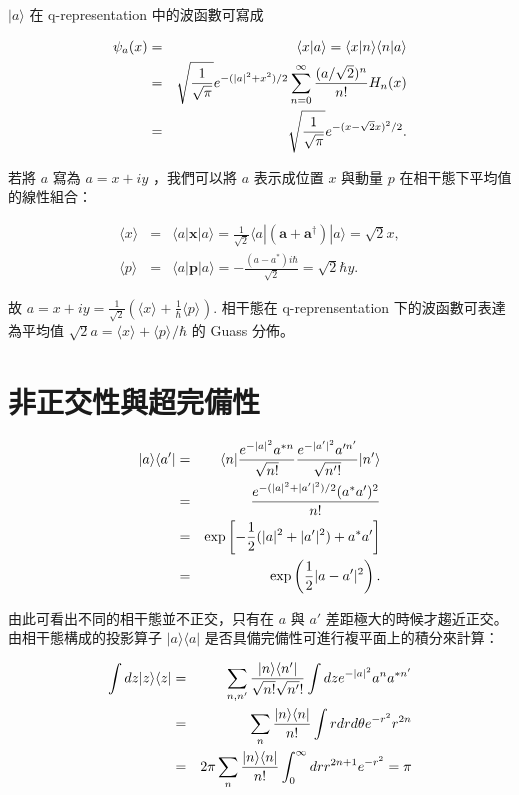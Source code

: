 \documentclass[pop,reprint]{revtex4-1}
\newcommand{\bra}[1]{\langle#1|}
\newcommand{\ket}[1]{|#1\rangle }
\newcommand{\braket}[2]{\langle#1|#2\rangle }
\newcommand{\expect}[2]{\langle #1\rangle_{#2}}
\begin{document}
$ \ket{a} $ 在 q-representation 中的波函數可寫成

\begin{eqnarray}
\notag\psi_a(x)&=&\braket{x}{a}=\braket{x}{n}\braket{n}{a}\\
\notag&=& \sqrt{\frac{1}{\sqrt{\pi}}}e^{-(|a|^2+x^2)/2}\sum_{n=0}^\infty\frac{(a/\sqrt{2})^n}{n!}H_n(x)\\
&=&\sqrt{\frac{1}{\sqrt{\pi}}}e^{-(x-\sqrt{2}x)^2/2}.
\end{eqnarray}

若將 $ a $ 寫為 $ a=x+iy $ ，我們可以將 $ a $ 表示成位置 $ x $ 與動量 $ p $ 在相干態下平均值的線性組合：

\begin{eqnarray}
\expect{x}{}&=&\bra{a}\bm{x}\ket{a}=\frac{1}{\sqrt{2}}\bra{a}(\bm{a}+\bm{a}^\dag)\ket{a}=\sqrt{2}x,\\
\expect{p}{}&=&\bra{a}\bm{p}\ket{a}=-\frac{(a-a^*)i\hbar}{\sqrt{2}}=\sqrt{2}\hbar y.
\end{eqnarray}

故 $ \displaystyle a=x+iy=\frac{1}{\sqrt{2}}\left(\expect{x}{}+\frac{1}{\hbar}\expect{p}{}\right) $. 相干態在 q-reprensentation 下的波函數可表達為平均值 $ \sqrt{2}a=\expect{x}{}+\expect{p}{}/\hbar $ 的 Guass 分佈。

\section{非正交性與超完備性}

\begin{eqnarray}
\notag\ket{a}\bra{a'}&=&\bra{n}\frac{e^{-|a|^2}a^{*n}}{\sqrt{n!}}\frac{e^{-|a'|^2}a'^{n'}}{\sqrt{n'!}}\ket{n'}\\
\notag&=&\frac{e^{-(|a|^2+|a'|^2)/2}(a^*a')^2}{n!}\\
\notag&=&\exp\left[-\frac{1}{2}(|a|^2+|a'|^2)+a^*a'\right]\\
&=&\exp\left(\frac{1}{2}|a-a'|^2\right).
\end{eqnarray}

由此可看出不同的相干態並不正交，只有在 $ a $ 與 $ a' $ 差距極大的時候才趨近正交。由相干態構成的投影算子 $ \ket{a}\bra{a} $ 是否具備完備性可進行複平面上的積分來計算：

\begin{eqnarray}
\notag\int dz\ket{z}\bra{z}&=&\sum_{n,n'}\frac{\ket{n}\bra{n'}}{\sqrt{n!}\sqrt{n'}!}
\int dz e^{-|a|^2}a^na^{*n'}\\
\notag&=&\sum_{n}\frac{\ket{n}\bra{n}}{n!}\int rdrd\theta e^{-r^2}r^{2n}\\
&=&2\pi\sum_{n}\frac{\ket{n}\bra{n}}{n!}\int_0^\infty dr r^{2n+1}e^{-r^2}=\pi
\end{eqnarray} 
\end{document}
